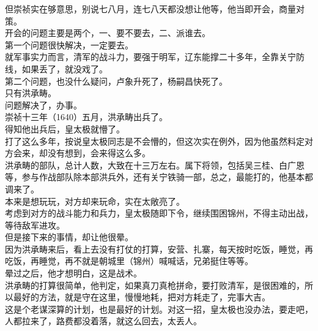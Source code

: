 \begin{multicols}{\theparacolNo}
但崇祯实在够意思，别说七八月，连七八天都没想让他等，他当即开会，商量对策。\\

开会的问题主要是两个，一、要不要去，二、派谁去。\\

第一个问题很快解决，一定要去。\\

就军事实力而言，清军的战斗力，要强于明军，辽东能撑二十多年，全靠关宁防线，如果丢了，就没戏了。\\

第二个问题，也没什么疑问，卢象升死了，杨嗣昌快死了。\\

只有洪承畴。\\

问题解决了，办事。\\

崇祯十三年（1640）五月，洪承畴出兵了。\\

得知他出兵后，皇太极就懵了。\\

打了这么多年，按说皇太极同志是不会懵的，但这次实在例外，因为他虽然料定对方会来，却没有想到，会来得这么多。\\

洪承畴的部队，总计人数，大致在十三万左右。属下将领，包括吴三桂、白广恩等，参与作战部队除本部洪兵外，还有关宁铁骑一部，总之，最能打的，他基本都调来了。\\

本来是想玩玩，对方却来玩命，实在太敞亮了。\\

考虑到对方的战斗能力和兵力，皇太极随即下令，继续围困锦州，不得主动出战，等待敌军进攻。\\

但是接下来的事情，却让他很晕。\\

因为洪承畴来后，看上去没有打仗的打算，安营、扎寨，每天按时吃饭，睡觉，再吃饭，再睡觉，再不就是朝城里（锦州）喊喊话，兄弟挺住等等。\\

晕过之后，他才想明白，这是战术。\\

洪承畴的打算很简单，他判定，如果真刀真枪拼命，要打败清军，是很困难的，所以最好的方法，就是守在这里，慢慢地耗，把对方耗走了，完事大吉。\\

这是个老谋深算的计划，也是最好的计划。对这一招，皇太极也没办法，要走吧，人都拉来了，路费都没着落，就这么回去，太丢人。\\


\end{multicols}
